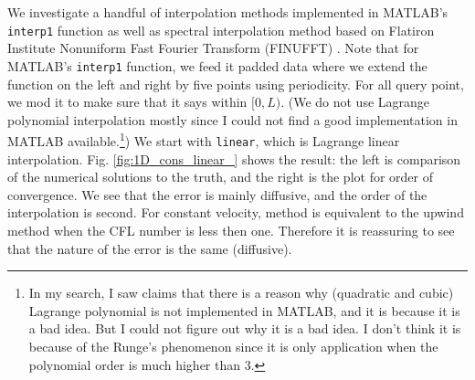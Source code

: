 \documentclass[11pt,letterpaper]{article}
\begin{document}
We investigate a handful of interpolation methods implemented in MATLAB's \texttt{interp1} function as well as spectral interpolation method based on Flatiron Institute Nonuniform Fast Fourier Transform (FINUFFT) \cite{finufft_1,finufft_2}. Note that for MATLAB's \texttt{interp1} function, we feed it padded data where we extend the function on the left and right by five points using periodicity. For all query point, we mod it to make sure that it says within $[0,L)$. (We do not use Lagrange polynomial interpolation mostly since I could not find a good implementation in MATLAB available.\footnote{In my search, I saw claims that there is a reason why (quadratic and cubic) Lagrange polynomial is not implemented in MATLAB, and it is because it is a bad idea. But I could not figure out why it is a bad idea. I don't think it is because of the Runge's phenomenon since it is only application when the polynomial order is much higher than 3.}) We start with \texttt{linear}, which is Lagrange linear interpolation. Fig. \ref{fig:1D_cons_linear_} shows the result: the left is comparison of the numerical solutions to the truth, and the right is the plot for order of convergence. We see that the error is mainly diffusive, and the order of the interpolation is second. For constant velocity, \sml\;method is equivalent to the upwind method when the CFL number is less then one. Therefore it is reassuring to see that the nature of the error is the same (diffusive).
\end{document}
